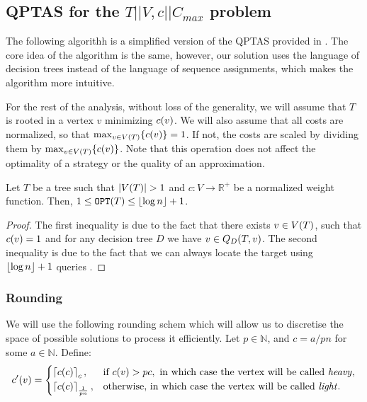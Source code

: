 \subsection{QPTAS for the $T||V,c||C_{max}$ problem}

The following algorithh is a simplified version of the QPTAS provided in \cite{dereniowski2017ApproxSsForGeneralBSinWTs}. The core idea of the algorithm is the same, however, our solution uses the language of decision trees instead of the language of sequence assignments, which makes the algorithm more intuitive.

For the rest of the analysis, without loss of the generality, we will assume that $T$ is rooted in a vertex $v$ minimizing $c\mathopen{}\left( v \right)$.  We will also assume that all costs are normalized, so that $\max_{v\in V\mathopen{}\left( T \right)}\mathopen{}\left\{ c\mathopen{}\left( v \right) \right\}=1$. If not, the costs are scaled by dividing them by $\max_{v\in V\mathopen{}\left( T \right)}\mathopen{}\left\{ c(v) \right\}$. Note that this operation does not affect the optimality of a strategy or the quality of an approximation.
\begin{observation}\label{basicBoundsOnCost}
    Let $T$ be a tree such that $\spr{V\br{T}}> 1$ and $c:V\to \mathbb{R}^+$ be a normalized weight function. Then, $1\leq \texttt{OPT}(T) \leq \mathopen{}\left\lfloor \log n \right\rfloor+1$.
    \begin{proof}
        The first inequality is due to the fact that there exists $v\in V\mathopen{}\left( T \right)$, such that $c\mathopen{}\left( v \right)=1$ and for any decision tree $D$ we have $v\in Q_{D}\mathopen{}\left( T,v \right)$. The second inequality is due to the fact that we can always locate the target using $\mathopen{}\left\lfloor \log n \right\rfloor+1$ queries \cite{OnakParys2006GenOfBSSInTsAndFLikePosets}.
    \end{proof}
\end{observation}
\subsubsection{Rounding}
We will use the following rounding schem which will allow us to discretise the space of possible solutions to process it efficiently. Let $p \in\mathbb{N}$, and $c=a/pn$ for some $a\in\mathbb{N}$. Define:
$$
c'\mathopen{}\left( v \right)=\begin{cases}
    \mathopen{}\left\lceil c\mathopen{}\left( c \right) \right\rceil_c, & \text{if } c\mathopen{}\left( v \right)>pc, \text{ in which case the vertex will be called \textit{heavy}},\\
    \mathopen{}\left\lceil c\mathopen{}\left( c \right) \right\rceil_{\frac{1}{pn}}, & \text{otherwise, in which case the vertex will be called \textit{light}}.\\
\end{cases}
$$

